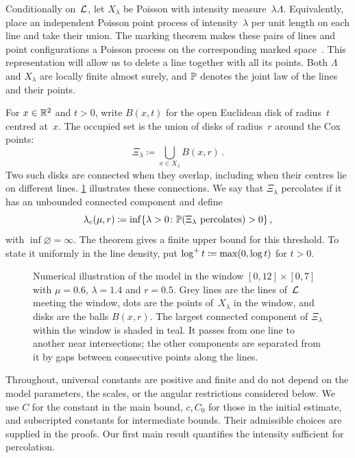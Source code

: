 \documentclass[11pt,letterpaper]{article}
\begin{document}
Conditionally on~$\cL$, let $X_\lambda$ be Poisson with intensity measure~$\lambda\Lambda$. Equivalently, place an independent Poisson point process of intensity~$\lambda$ per unit length on each line and take their union. The marking theorem makes these pairs of lines and point configurations a Poisson process on the corresponding marked space~\cite[Theorem~5.6]{LP17}. This representation will allow us to delete a line together with all its points. Both $\Lambda$ and $X_\lambda$ are locally finite almost surely, and $\P$ denotes the joint law of the lines and their points.

For $x\in\R^2$ and $t>0$, write $B(x,t)$ for the open Euclidean disk of radius~$t$ centred at~$x$. The occupied set is the union of disks of radius~$r$ around the Cox points:
\begin{equation}\label{eq:occupied-set}
  \Xi_\lambda\coloneqq\bigcup_{x\in X_\lambda}B(x,r)\,.
\end{equation}
Two such disks are connected when they overlap, including when their centres lie on different lines. \cref{fig:model} illustrates these connections. We say that $\Xi_\lambda$ percolates if it has an unbounded connected component and define
\begin{equation}\label{eq:critical-intensity}
  \lambda_c(\mu,r)\coloneqq\inf\{\lambda>0\colon\P(\Xi_\lambda\text{ percolates})>0\}\,,
\end{equation}
with $\inf\varnothing=\infty$. The theorem gives a finite upper bound for this threshold. To state it uniformly in the line density, put $\logp t\coloneqq\max(0,\log t)$ for $t>0$.

\begin{figure}[ht]
  \centering
  
  \caption{Numerical illustration of the model in the window $[0,12]\times[0,7]$ with $\mu=0.6$, $\lambda=1.4$ and $r=0.5$. Grey lines are the lines of~$\cL$ meeting the window, dots are the points of~$X_\lambda$ in the window, and disks are the balls $B(x,r)$. The largest connected component of $\Xi_\lambda$ within the window is shaded in teal. It passes from one line to another near intersections; the other components are separated from it by gaps between consecutive points along the lines.}
  \label{fig:model}
\end{figure}

Throughout, universal constants are positive and finite and do not depend on the model parameters, the scales, or the angular restrictions considered below. We use $C$ for the constant in the main bound, $c,C_0$ for those in the initial estimate, and subscripted constants for intermediate bounds. Their admissible choices are supplied in the proofs. Our first main result quantifies the intensity sufficient for percolation.
\end{document}
